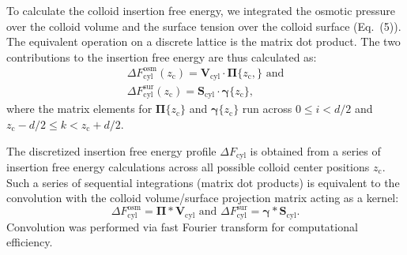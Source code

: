 \documentclass[10pt, a4paper]{article}
\begin{document}
\begin{multicols}{2}
To calculate the colloid insertion free energy, we integrated the osmotic pressure over the colloid volume and the surface tension over the colloid surface (Eq.~(5)).
The equivalent operation on a discrete lattice is the matrix dot product.
The two contributions to the insertion free energy are thus calculated as:
\begin{equation}\label{eq:cyl_fe_osm}
    \begin{split}
        \Delta F_{\text{cyl}}^{\text{osm}}(z_{\text{c}}) = \bm{V}_{\text{cyl}} \cdot \boldsymbol{\Pi}\{z_{\text{c}},\} \text{ and}
        \\
        \Delta F_{\text{cyl}}^{\text{sur}}(z_{\text{c}}) = \bm{S}_{\text{cyl}} \cdot \boldsymbol{\gamma}\{z_{\text{c}}\},
    \end{split}
\end{equation}
where the matrix elements for $\boldsymbol{\Pi}\{z_{\text{c}}\}$ and $\boldsymbol{\gamma}\{z_{\text{c}}\}$ run across $0 \leq i < d/2$ and $z_{\text{c}} - d/2 \leq k < z_{\text{c}} + d/2$.

The discretized insertion free energy profile $\Delta F_{\text{cyl}}$ is obtained from a series of insertion free energy calculations across all possible colloid center positions $z_{\text{c}}$.
Such a series of sequential integrations (matrix dot products) is equivalent to the convolution with the colloid volume/surface projection matrix acting as a kernel:
\begin{equation}
    \Delta F_{\text{cyl}}^{\text{osm}} = \boldsymbol{\Pi} \ast \bm{V}_{\text{cyl}} \text{ and }
    \Delta F_{\text{cyl}}^{\text{sur}} = \boldsymbol{\gamma} \ast \bm{S}_{\text{cyl}}.
\end{equation}
Convolution was performed via fast Fourier transform for computational efficiency.

\end{multicols}


\end{document}
